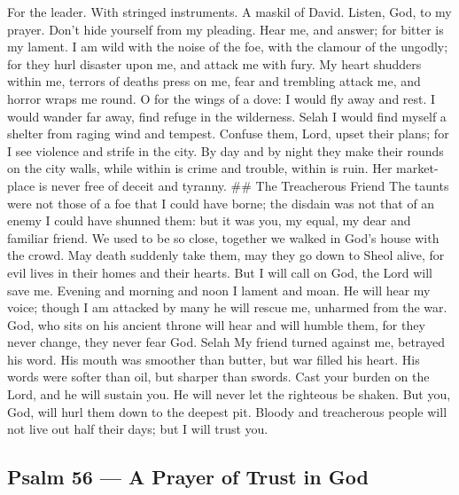 For the leader. With stringed instruments. A maskil of David.
 Listen, God, to my prayer. Don't hide yourself from my
pleading.  Hear me, and answer; for bitter is my lament.
 I am wild with the noise of the foe, with the clamour of
the ungodly; for they hurl disaster upon me, and attack me with fury.
 My heart shudders within me, terrors of deaths press on me,
 fear and trembling attack me, and horror wraps me round.
 O for the wings of a dove: I would fly away and rest.
 I would wander far away, find refuge in the wilderness.
Selah  I would find myself a shelter from raging wind and
tempest.  Confuse them, Lord, upset their plans; for I see
violence and strife in the city.  By day and by night they
make their rounds on the city walls, while within is crime and trouble,
 within is ruin. Her market-place is never free of deceit
and tyranny. \#\# The Treacherous Friend  The taunts were
not those of a foe that I could have borne; the disdain was not that of
an enemy I could have shunned them:  but it was you, my
equal, my dear and familiar friend.  We used to be so
close, together we walked in God's house with the crowd. 
May death suddenly take them, may they go down to Sheol alive, for evil
lives in their homes and their hearts.  But I will call on
God, the Lord will save me.  Evening and morning and noon I
lament and moan. He will hear my voice;  though I am
attacked by many he will rescue me, unharmed from the war. 
God, who sits on his ancient throne will hear and will humble them, for
they never change, they never fear God. Selah  My friend
turned against me, betrayed his word.  His mouth was
smoother than butter, but war filled his heart. His words were softer
than oil, but sharper than swords.  Cast your burden on the
Lord, and he will sustain you. He will never let the righteous be
shaken.  But you, God, will hurl them down to the deepest
pit. Bloody and treacherous people will not live out half their days;
but I will trust you.

\hypertarget{psalm-56-a-prayer-of-trust-in-god}{%
\subsection{Psalm 56 --- A Prayer of Trust in
God}\label{psalm-56-a-prayer-of-trust-in-god}}

